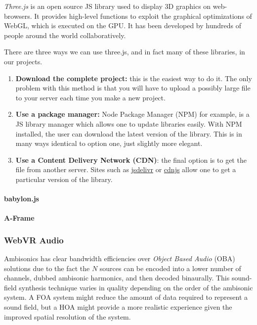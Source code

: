 \textit{Three.js} is an open source JS library used to display 3D graphics on web-browsers. It provides high-level functions to exploit the graphical optimizations of WebGL, which is executed on the GPU. It has been developed by hundreds of people around the world collaboratively. 

There are three ways we can use three.js, and in fact many of these libraries, in our projects. 

\begin{enumerate}
    \item \textbf{Download the complete project:} this is the easiest way to do it. The only problem with this method is that you will have to upload a possibly large file to your server each time you make a new project. 
    
    \item \textbf{Use a package manager:} Node Package Manager (NPM) for example, is a JS library manager which allows one to update libraries easily. With NPM installed, the user can download the latest version of the library. This is in many ways identical to option one, just slightly more elegant.
    
    \item \textbf{Use a Content Delivery Network (CDN)}: the final option is to get the file from another server. Sites such as \href{https://www.jsdelivr.com/package/npm/three}{jsdelivr} or \href{https://cdnjs.com/libraries/three.js}{cdnjs} allow one to get a particular version of the library. 
    
\end{enumerate}


\paragraph{babylon.js}

\paragraph{A-Frame}






\subsubsection{WebVR Audio}

Ambisonics has clear bandwidth efficiencies over \textit{Object Based Audio} (OBA) solutions due to the fact the $N$ sources can be encoded into a lower number of channels, dubbed ambisonic harmonics, and then decoded binaurally. This sound-field synthesis technique varies in quality depending on the order of the ambisonic system. A FOA system might reduce the amount of data required to represent a sound field, but a HOA might provide a more realistic experience given the improved spatial resolution of the system.

